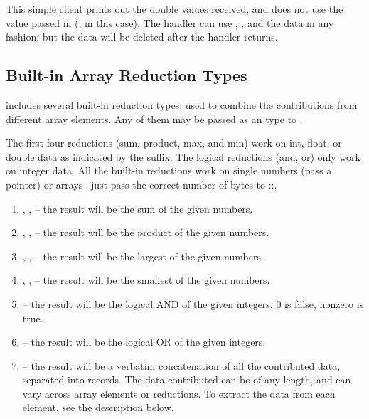This simple client prints out the double values received, and does not
use the  value passed in (, in this case).  The
handler can use , , and the data in any
fashion; but the data will be deleted after the handler returns.


\subsection{Built-in Array Reduction Types}
\charmpp includes several built-in reduction types, used to combine the contributions from different array elements.  Any of them may be passed as an  type to .

The first four reductions (sum, product, max, and min) work on int,
float, or double data as indicated by the suffix.  The logical
reductions (and, or) only work on integer data.  All the built-in
reductions work on single numbers (pass a pointer) or arrays-- just
pass the correct number of bytes to
::.

\begin{enumerate}
\item {}, , -- the result will be the sum of the given numbers.

\item {}, , -- the result will be the product of the given numbers.

\item {}, , -- the result will be the largest of the given numbers.

\item {}, , -- the result will be the smallest of the given numbers.

\item {}-- the result will be the logical AND of the given integers.  0 is false, nonzero is true.

\item {}-- the result will be the logical OR of the given integers.

\item {}-- the result will be a verbatim concatenation of all the contributed data, separated into  records.  The data contributed can be of any length, and can vary across array elements or reductions.  To extract the data from each element, see the description below.

\end{enumerate}


